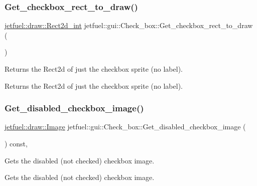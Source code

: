 \subsubsection{\texorpdfstring{Get\+\_\+checkbox\+\_\+rect\+\_\+to\+\_\+draw()}{Get\_checkbox\_rect\_to\_draw()}}
{\footnotesize\ttfamily \hyperlink{classjetfuel_1_1draw_1_1Rect2d}{jetfuel\+::draw\+::\+Rect2d\+\_\+int} jetfuel\+::gui\+::\+Check\+\_\+box\+::\+Get\+\_\+checkbox\+\_\+rect\+\_\+to\+\_\+draw (\begin{DoxyParamCaption}{ }\end{DoxyParamCaption})\hspace{0.3cm}{\ttfamily [inline]}}



Returns the Rect2d of just the checkbox sprite (no label). 

Returns the Rect2d of just the checkbox sprite (no label). \mbox{\label{classjetfuel_1_1gui_1_1Check__box_ae2f2067e485168d7e8794baa1890e9a6}} 
\subsubsection{\texorpdfstring{Get\+\_\+disabled\+\_\+checkbox\+\_\+image()}{Get\_disabled\_checkbox\_image()}}
{\footnotesize\ttfamily \hyperlink{classjetfuel_1_1draw_1_1Image}{jetfuel\+::draw\+::\+Image} jetfuel\+::gui\+::\+Check\+\_\+box\+::\+Get\+\_\+disabled\+\_\+checkbox\+\_\+image (\begin{DoxyParamCaption}{ }\end{DoxyParamCaption}) const\hspace{0.3cm}{\ttfamily [inline]}, {\ttfamily [protected]}}



Gets the disabled (not checked) checkbox image. 

Gets the disabled (not checked) checkbox image. \mbox{\label{classjetfuel_1_1gui_1_1Check__box_a67e0befe8a0919bf28b5090cddac397e}} 
